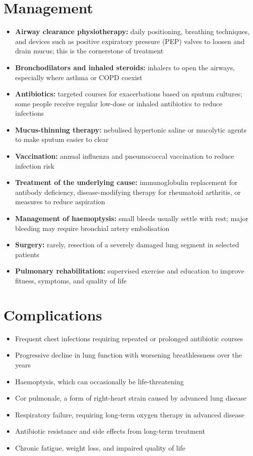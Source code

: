\section*{Management}
\begin{itemize}
    \item \textbf{Airway clearance physiotherapy:} daily positioning, breathing techniques, and devices such as positive expiratory pressure (PEP) valves to loosen and drain mucus; this is the cornerstone of treatment
    \item \textbf{Bronchodilators and inhaled steroids:} inhalers to open the airways, especially where asthma or COPD coexist
    \item \textbf{Antibiotics:} targeted courses for exacerbations based on sputum cultures; some people receive regular low-dose or inhaled antibiotics to reduce infections
    \item \textbf{Mucus-thinning therapy:} nebulised hypertonic saline or mucolytic agents to make sputum easier to clear
    \item \textbf{Vaccination:} annual influenza and pneumococcal vaccination to reduce infection risk
    \item \textbf{Treatment of the underlying cause:} immunoglobulin replacement for antibody deficiency, disease-modifying therapy for rheumatoid arthritis, or measures to reduce aspiration
    \item \textbf{Management of haemoptysis:} small bleeds usually settle with rest; major bleeding may require bronchial artery embolisation
    \item \textbf{Surgery:} rarely, resection of a severely damaged lung segment in selected patients
    \item \textbf{Pulmonary rehabilitation:} supervised exercise and education to improve fitness, symptoms, and quality of life
\end{itemize}

\section*{Complications}
\begin{itemize}
    \item Frequent chest infections requiring repeated or prolonged antibiotic courses
    \item Progressive decline in lung function with worsening breathlessness over the years
    \item Haemoptysis, which can occasionally be life-threatening
    \item Cor pulmonale, a form of right-heart strain caused by advanced lung disease
    \item Respiratory failure, requiring long-term oxygen therapy in advanced disease
    \item Antibiotic resistance and side effects from long-term treatment
    \item Chronic fatigue, weight loss, and impaired quality of life
\end{itemize}

